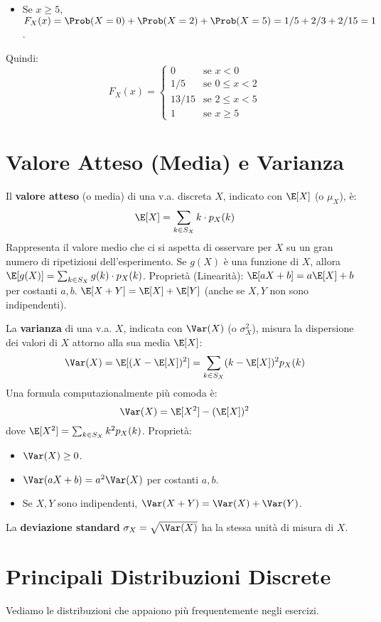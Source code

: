 \begin{example}
\begin{enumerate}
\begin{itemize}
        \item Se $x \ge 5$, $F_X(x) = \Prob(X=0) + \Prob(X=2) + \Prob(X=5) = 1/5 + 2/3 + 2/15 = 1$.
    \end{itemize}
    Quindi:
    \[ F_X(x) = \begin{cases} 0 & \text{se } x < 0 \\ 1/5 & \text{se } 0 \le x < 2 \\ 13/15 & \text{se } 2 \le x < 5 \\ 1 & \text{se } x \ge 5 \end{cases} \]
\end{enumerate}
\end{example}

\section{Valore Atteso (Media) e Varianza}
\begin{definition}
Il \textbf{valore atteso} (o media) di una v.a. discreta $X$, indicato con $\E[X]$ (o $\mu_X$), è:
\[ \E[X] = \sum_{k \in S_X} k \cdot p_X(k) \]
Rappresenta il valore medio che ci si aspetta di osservare per $X$ su un gran numero di ripetizioni dell'esperimento.
Se $g(X)$ è una funzione di $X$, allora $\E[g(X)] = \sum_{k \in S_X} g(k) \cdot p_X(k)$.
Proprietà (Linearità): $\E[aX+b] = a\E[X]+b$ per costanti $a,b$.
$\E[X+Y] = \E[X]+\E[Y]$ (anche se $X,Y$ non sono indipendenti).
\end{definition}

\begin{definition}[Varianza]
La \textbf{varianza} di una v.a. $X$, indicata con $\Var(X)$ (o $\sigma_X^2$), misura la dispersione dei valori di $X$ attorno alla sua media $\E[X]$:
\[ \Var(X) = \E[(X - \E[X])^2] = \sum_{k \in S_X} (k - \E[X])^2 p_X(k) \]
Una formula computazionalmente più comoda è:
\[ \Var(X) = \E[X^2] - (\E[X])^2 \]
dove $\E[X^2] = \sum_{k \in S_X} k^2 p_X(k)$.
Proprietà:
\begin{itemize}
    \item $\Var(X) \ge 0$.
    \item $\Var(aX+b) = a^2 \Var(X)$ per costanti $a,b$.
    \item Se $X, Y$ sono indipendenti, $\Var(X+Y) = \Var(X) + \Var(Y)$.
\end{itemize}
La \textbf{deviazione standard} $\sigma_X = \sqrt{\Var(X)}$ ha la stessa unità di misura di $X$.
\end{definition}

\section{Principali Distribuzioni Discrete}
Vediamo le distribuzioni che appaiono più frequentemente negli esercizi.

